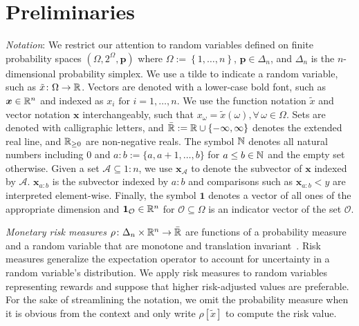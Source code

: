 \section{Preliminaries}\label{sec:preliminaries}

\emph{Notation}: We restrict our attention to random variables defined on finite probability spaces $(\Omega, 2^{\Omega}, \bm{p})$ where $\Omega := \left\{ 1, \dots , n \right\}$, $\bm{p} \in \Delta_n$, and $\Delta_n$ is the $n$-dimensional probability simplex. We use a tilde to indicate a random variable, such as $\tilde{x}\colon \Omega \to \mathbb{R}$. Vectors are denoted with a lower-case bold font, such as $\bm{x} \in \mathbb{R}^n$ and indexed as $x_i \text{ for } i = 1, \dots , n$. We use the function notation $\tilde{x}$ and vector notation $\bm{x}$ interchangeably, such that $x_\omega = \tilde{x}(\omega), \forall \,  \omega \in \Omega$. Sets are denoted with calligraphic letters, and $\bar{\mathbb{R}} := \mathbb{R} \cup \left\{ -\infty, \infty \right\}$ denotes the extended real line, and $\mathbb{R}_{\ge 0}$ are non-negative reals. The symbol $\mathbb{N}$ denotes all natural numbers including $0$ and $a{:}b := \{a, a+1, \dots , b\}$ for $a \le b \in \mathbb{N}$ and the empty set otherwise. Given a set $\mathcal{A} \subseteq 1{:}n$, we use $\bm{x}_{\mathcal{A}}$ to denote the subvector of $\bm{x}$ indexed by $\mathcal{A}$. $\bm{x}_{a{:}b}$ is the subvector indexed by $a{:}b$ and comparisons such as $\bm{x}_{a{:}b} < y$ are interpreted element-wise. Finally, the symbol $\bm{1}$ denotes a vector of all ones of the appropriate dimension and $\bm{1}_{\mathcal{O}} \in \mathbb{R}^n$ for $\mathcal{O} \subseteq \Omega$ is an indicator vector of the set $\mathcal{O}$.

\emph{Monetary risk measures} $\rho\colon \Delta_n \times \mathbb{R}^n \to \bar{\mathbb{R}}$ are functions of a probability measure and a random variable that are monotone and translation invariant~\cite{Follmer2016}. Risk measures generalize the expectation operator to account for uncertainty in a random variable's distribution. We apply risk measures to random variables representing rewards and suppose that higher risk-adjusted values are preferable. For the sake of streamlining the notation, we omit the probability measure when it is obvious from the context and only write $\rho[\tilde{x}]$ to compute the risk value.

